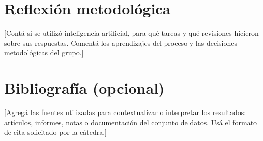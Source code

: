 \documentclass[12pt,a4paper]{article}
\begin{document}
\section{Reflexión metodológica}
[Contá si se utilizó inteligencia artificial, para qué tareas y qué revisiones hicieron sobre sus respuestas. Comentá los aprendizajes del proceso y las decisiones metodológicas del grupo.]

\section{Bibliografía (opcional)}
[Agregá las fuentes utilizadas para contextualizar o interpretar los resultados: artículos, informes, notas o documentación del conjunto de datos. Usá el formato de cita solicitado por la cátedra.]
\end{document}
